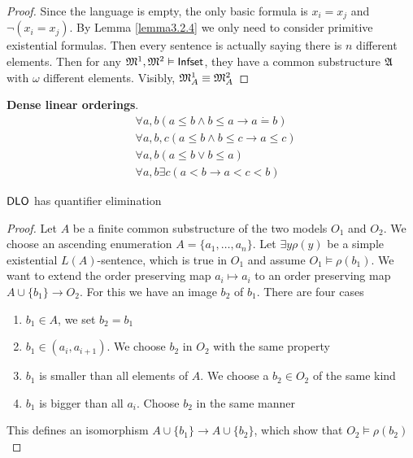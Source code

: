 \documentclass[11pt]{article}
\begin{document}
\begin{proof}
Since the language is empty, the only basic formula is \(x_i=x_j\) and
\(\neg(x_i=x_j)\). By Lemma \ref{lemma3.2.4} we only need to consider primitive
existential formulas. Then every sentence is actually saying there is \(n\) different elements.
Then for any \(\mathfrak{M}^1,\mathfrak{M}^2\vDash\operatorname{\textsf{Infset}}\), they have a common substructure \(\mathfrak{A}\) with \(\omega\) different elements.
Visibly, \(\mathfrak{M}^1_A\equiv\mathfrak{M}^2_A\)
\end{proof}

\textbf{Dense linear orderings}.
\begin{align*}
&\forall a,b(a\le b\wedge b\le a\to a\dot{=}b)\\
&\forall a,b,c(a\le b\wedge b\le c\to a\le c)\\
&\forall a,b(a\le b\vee b\le a)\\
&\forall a,b\exists c(a< b\to a< c< b)
\end{align*}
\begin{theorem}[]
\(\operatorname{\textsf{DLO}}\) has quantifier elimination
\end{theorem}

\begin{proof}
Let \(A\) be a finite common substructure of the two models \(O_1\) and
\(O_2\). We choose an ascending enumeration \(A=\{a_1,\dots,a_n\}\). Let
\(\exists y\rho (y)\) be a simple existential \(L(A)\)-sentence, which is
true in \(O_1\) and assume \(O_1\vDash\rho(b_1)\). We want to extend the
order preserving map \(a_i\mapsto a_i\) to an order preserving map
\(A\cup\{b_1\}\to O_2\). For this we have an image \(b_2\) of \(b_1\). There
are four cases
\begin{enumerate}
\item \(b_1\in A\), we set \(b_2=b_1\)
\item \(b_1\in(a_i,a_{i+1})\). We choose \(b_2\) in \(O_2\) with the same property
\item \(b_1\) is smaller than all elements of \(A\). We choose a \(b_2\in O_2\)
of the same kind
\item \(b_1\) is bigger than all \(a_i\). Choose \(b_2\) in the same manner
\end{enumerate}


This defines an isomorphism \(A\cup\{b_1\}\to A\cup\{b_2\}\), which show that \(O_2\vDash\rho(b_2)\)
\end{proof}
\end{document}
